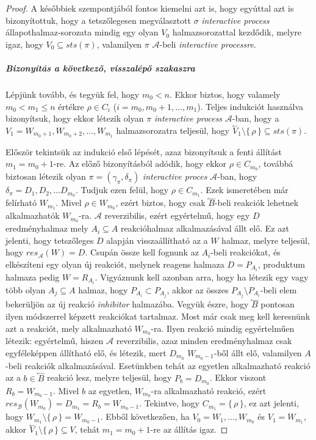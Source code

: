 \documentclass[12pt]{article}
\theoremstyle{definition}
\theoremstyle{remark}
\theoremstyle{plain}
\theoremstyle{plain}
\newcommand{\backwardhat}{\overset{\leftharpoonup}}
\newcommand{\res}{\textit{res}}
\begin{document}
\begin{proof}
        A későbbiek szempontjából fontos kiemelni azt is, hogy egyúttal azt is bizonyítottuk, hogy a tetszőlegesen megválasztott $\sigma$ \textit{interactive process} állapothalmaz-sorozata mindig egy olyan $V_{0}$ halmazsorozattal kezdődik, melyre igaz, hogy $V_{0} \subseteq \textit{sts}(\pi)$, valamilyen $\pi$ $\mathscr{A}$-beli \textit{interactive processre}.
        \subparagraph{Bizonyítás a következő, visszalépő szakaszra}
        Lépjünk tovább, és tegyük fel, hogy $m_{0} < n$. Ekkor biztos, hogy valamely $m_{0} < m_{1} \leq n$ értékre $\rho \in C_{i}$ ($i = m_{0}, m_{0} + 1, \ldots, m_{1}$). Teljes indukciót használva bizonyítsuk, hogy ekkor létezik olyan $\pi$ \textit{interactive process} $\mathscr{A}$-ban, hogy a $V_{1} = W_{m_{0} + 1}, W_{m_{0} + 2}, \ldots, W_{m_{1}}$ halmazsorozatra teljesül, hogy $\backwardhat V_{1} \setminus \{\, \rho \,\} \subseteq \textit{sts}(\pi)$.

        Először tekintsük az indukció első lépését, azaz bizonyítsuk a fenti állítást $m_{1} = m_{0} + 1$-re. Az előző bizonyításból adódik, hogy ekkor $\rho \in C_{m_{0}}$, továbbá biztosan létezik olyan $\pi = (\gamma_{\pi}, \delta_{\pi})$ \textit{interactive proces} $\mathscr{A}$-ban, hogy $\delta_{\pi} = D_{1}, D_{2}, \ldots D_{m_{0}}$. Tudjuk ezen felül, hogy $\rho \in C_{m_{1}}$. Ezek ismeretében már felírható $W_{m_{1}}$. Mivel $\rho \in W_{m_{0}}$, ezért biztos, hogy csak $\backwardhat B$-beli reakciók lehetnek alkalmazhatók $W_{m_{0}}$-ra. $\mathscr{A}$ reverzibilis, ezért egyértelmű, hogy egy $D$ eredményhalmaz mely $A_{i} \subseteq A$ reakcióhalmaz alkalmazásával állt elő. Ez azt jelenti, hogy tetszőleges $D$ alapján visszaállítható az a $W$ halmaz, melyre teljesül, hogy $\res_{\mathscr{A}}(W)=D$. Csupán össze kell fognunk az $A_{i}$-beli reakciókat, és elkészíteni egy olyan új reakciót, melynek reagens halmaza $D = P_{A_{i}}$, produktum halmaza pedig $W = R_{A_{i}}$. Vigyáznunk kell azonban arra, hogy ha létezik egy vagy több olyan $A_{j} \subseteq A$ halmaz, hogy $P_{A_{i}} \subset P_{A_{j}}$, akkor az összes $P_{A_{j}} \setminus P_{A_{i}}$-beli elem bekerüljön az új reakció \textit{inhibitor} halmazába. Vegyük észre, hogy $\backwardhat B$ pontosan ilyen módszerrel képzett reakciókat tartalmaz. Most már csak meg kell keresnünk azt a reakciót, mely alkalmazható $W_{m_{0}}$-ra. Ilyen reakció mindig egyértelműen létezik: egyértelmű, hiszen $\mathscr{A}$ reverzibilis, azaz minden eredményhalmaz csak egyféleképpen állítható elő, és létezik, mert $D_{m_{0}}$ $W_{m_{0} - 1}$-ből állt elő, valamilyen $A$-beli reakciók alkalmazásával. Esetünkben tehát az egyetlen alkalmazható reakció az a $b \in \backwardhat B$ reakció lesz, melyre teljesül, hogy $P_{b} = D_{m_{0}}$. Ekkor viszont $R_{b} = W_{m_{0} - 1}$. Mivel $b$ az egyetlen, $W_{m_{0}}$-ra alkalmazható reakció, ezért $\res_{\mathscr{B}}(W_{m_{0}}) = D_{m_{1}} = R_{b} = W_{m_{0} - 1}$. Tekintve, hogy $C_{m_{1}} = \{\,\rho\,\}$, ez azt jelenti, hogy $W_{m_{1}} \setminus \{ \, \rho \,\} = W_{m_{0} - 1}$. Ebből következően, ha $V_{0} = W_{1}, \ldots, W_{m_{0}}$ és $V_{1} = W_{m_{1}}$, akkor $\backwardhat V_{1} \setminus \{\,\rho\,\} \subseteq V$, tehát $m_{1} = m_{0} + 1$-re az állítás igaz.
        

\end{proof}
\end{document}
